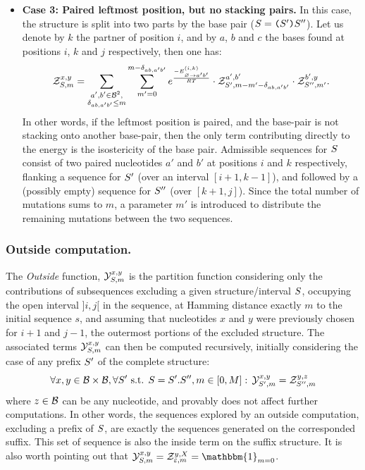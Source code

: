 \begin{itemize}
\item {\bf Case 3: Paired leftmost position, but no stacking pairs.} In this case, the structure is split into two parts by the base pair ($S = \text{\tt(} S'\text{\tt )}S''$). Let us denote by $k$ the partner of position $i$, and by $a$, $b$ and $c$ the bases found at positions $i$, $k$ and $j$ respectively, then one has:
\begin{equation}
\label{eq:Z_rec_C}
	\mathcal{Z}_{S, m}^{x,y}=\sum_{\substack{a',b'\in \mathcal{B}^2,\\ \delta_{ab, a'b'}\le m}}
      \sum_{m'=0}^{m-\delta_{ab,a'b'}}
   		 e^{\frac{-E^{(i,k)}_{{\varnothing}\to{a'b'}}}{RT}}
      \cdot\mathcal{Z}_{S', m-m'-\delta_{ab,a'b'}}^{a',b'}
      \cdot\mathcal{Z}_{S'', m'}^{b',y}.
\end{equation}
In other words, if the leftmost position is paired, and the base-pair is not stacking onto another base-pair, then the  only term contributing directly to the energy is the isostericity of the base pair. Admissible sequences for $S$ consist of two paired nucleotides $a'$ and $b'$ at positions $i$ and $k$ respectively, flanking a sequence for $S'$ (over an interval $[i+1,k-1]$), and followed by a (possibly empty) sequence for $S''$ (over $[k+1,j]$). Since the total number of mutations sums to $m$, a parameter $m'$ is introduced to distribute the remaining mutations between the two sequences.
\end{itemize}



\subsubsection{Outside computation.}	

The \emph{Outside} function, $\mathcal{Y}_{S, m}^{x,y}$ is the partition function considering only the 
contributions of subsequences excluding a given structure/interval $S$, occupying the open interval $]i,j[$ in the sequence, at Hamming distance exactly $m$ to the initial sequence $s$, and assuming that nucleotides $x$ and $y$ were previously chosen for $i+1$ and $j-1$, the outermost portions of the excluded structure.
The associated terms $\mathcal{Y}_{S, m}^{x,y}$ can then be computed recursively, initially considering the case of any prefix $S'$ of the complete structure:
\begin{equation}
	\forall x,y\in \mathcal{B}\times \mathcal{B}, \forall S'\text{ s.t. }S=S'.S'', m\in [0,M]:\, \mathcal{Y}_{S', m}^{x,y}=\mathcal{Z}_{S'', m}^{y,z}
\label{eq:Y_in}
\end{equation}
where $z\in\mathcal{B}$ can be any nucleotide, and provably does not affect further computations. 
In other words, the sequences explored by an outside computation, excluding a prefix of $S$, are exactly the sequences generated on the corresponded suffix. This set of sequence is also the inside term on the suffix structure.
It is also worth pointing out that $\Y{\Struct}{m}{x,y}= \Z{\varepsilon}{m}{y,X}=\mathbbm{1}_{m=0}$.

